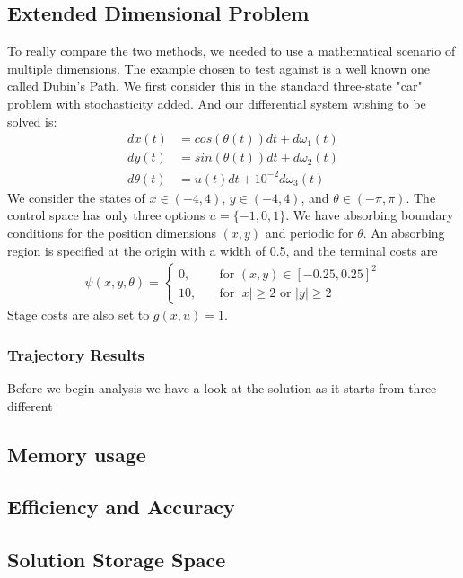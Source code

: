 \documentclass[11pt,draftd]{article}
\begin{document}
\subsection{Extended Dimensional Problem} 
To really compare the two methods, we needed to use a mathematical scenario of multiple dimensions. The example chosen to test against is a well known one called Dubin's Path. We first consider this in the standard three-state "car" problem with stochasticity added. And our differential system wishing to be solved is: 
\begin{align*} 
  dx(t) &= cos(\theta(t))dt + d\omega_1 (t) \\ 
  dy(t) &= sin(\theta(t))dt + d\omega_2 (t) \\ 
  d\theta(t) &= u(t)dt + 10^{-2}d\omega_3 (t) 
\end{align*} 
We consider the states of $ x \in (-4,4),\, y\in(-4,4) $, and $ \theta \in (-\pi,\pi) $. The control space has only three options $ u = \{-1, 0, 1\} $. We have absorbing boundary conditions for the position dimensions $ (x,y) $ and periodic for $ \theta $. An absorbing region is specified at the origin with a width of 0.5, and the terminal costs are 
\begin{align*} 
  \psi(x,y,\theta) = \begin{cases} 
  0, \quad & \text{for }(x,y)\in [-0.25, 0.25]^{2} \\ 
  10,\quad & \text{for }|x| \ge 2 \text{ or } |y| \ge 2 
  \end{cases} 
\end{align*} 
Stage costs are also set to $ g(x,u) = 1 $.  
\subsubsection{Trajectory Results} 
Before we begin analysis we have a look at the solution as it starts from three different  
\subsection{Memory usage}
\subsection{Efficiency and Accuracy}
\subsection{Solution Storage Space}
\end{document}
